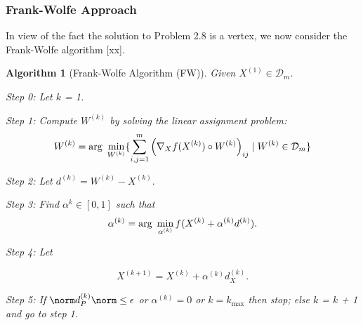 \documentclass{amsart}
\theoremstyle{plain} \newtheorem{Exa}{Example}[section]
\newtheorem{Alg}{Algorithm}[section]
\begin{document}
\subsubsection{Frank-Wolfe Approach}
In view of the fact the solution to Problem 2.8 is a vertex,
we now consider the Frank-Wolfe algorithm [xx].

\begin{Alg}[Frank-Wolfe Algorithm (FW)]
Given $ X^{(1)} \in \mathcal D_m $.
\item {Step 0:} Let $k$ = 1.

\item {Step 1:} Compute $W^{(k)}$  by solving the
linear assignment problem:
$$
W^{(k)} = {\text{\rm arg }} \min_{W^{(k)}}
\lbrace { \sum_{i,j=1}^m \left( \nabla_X f(X^{(k)}) \circ W^{(k)} \right)_{ij}
\mid W^{(k)} \in {\mathcal D_m} }\rbrace
$$
\item {Step 2:} Let $d^{(k)} = W^{(k)} - X^{(k)}. $
\item {Step 3:} Find $\alpha^k \in [0,1]$ such that
$$\alpha^{(k)}={\text{\rm arg }} \min_{\alpha^{(k)}}
f(X^{(k)} + \alpha^{(k)} d^{(k)}).
$$
\item {Step 4:} Let

$$ X^{(k+1)} = X^{(k)} + \alpha^{(k)} d_X^{(k)}. $$
\item {Step 5:} 
If $\norm d^{(k)}_{P} \norm \le \epsilon$ or $\alpha^{(k)}=0$ or $k=k_{\max}$
then stop; else $k$ = $k$ + 1 and go to step 1.
\end{Alg}
\end{document}
